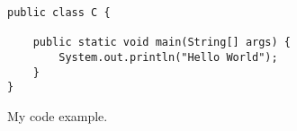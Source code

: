 \begin{figure}
    \begin{lstlisting}[style=Java-github]
public class C {

    public static void main(String[] args) {
        System.out.println("Hello World");
    }
}
    \end{lstlisting}
    \caption{My code example.}
    \label{fig:code}
\end{figure}

